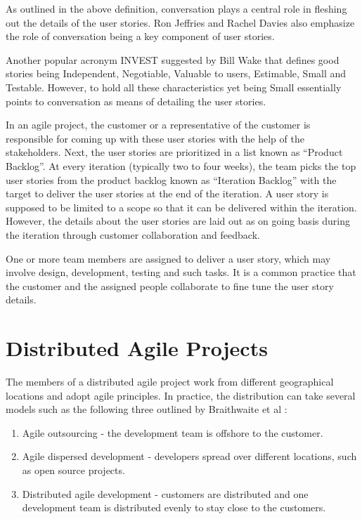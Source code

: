 As outlined in the above definition, conversation plays a central role in fleshing out the details of the user stories. Ron Jeffries \cite{ron_jeffries} and Rachel Davies\cite{rachel_davies} also emphasize the role of conversation being a key component of user stories.

Another popular acronym INVEST suggested by Bill Wake \cite{bill_wake} that defines good stories being Independent, Negotiable, Valuable to users, Estimable, Small and Testable. However, to hold all these characteristics yet being Small essentially points to conversation as means of detailing the user stories.

In an agile project, the customer or a representative of the customer is responsible for coming up with these user stories with the help of the stakeholders. Next, the user stories are prioritized in a list known as ``Product Backlog''. At every iteration (typically two to four weeks), the team picks the top user stories from the product backlog known as ``Iteration Backlog'' with the target to deliver the user stories at the end of the iteration. A user story is supposed to be limited to a scope so that it can be delivered within the iteration. However, the details about the user stories are laid out as on going basis during the iteration through customer collaboration and feedback.

One or more team members are assigned to deliver a user story, which may involve design, development, testing and such tasks. It is a common practice that the customer and the assigned people collaborate to fine tune the user story details.

\section{Distributed Agile Projects}
The members of a distributed agile project work from different geographical locations and adopt agile principles. In practice, the distribution can take several models such as the following three outlined by Braithwaite et al \cite{xp_expanded}:

\begin{enumerate}
	\item Agile outsourcing - the development team is offshore to the customer.
	\item Agile dispersed development - developers spread over different locations, such as open source projects.
	\item Distributed agile development - customers are distributed and one development team is distributed evenly to stay close to the customers.
\end{enumerate}

